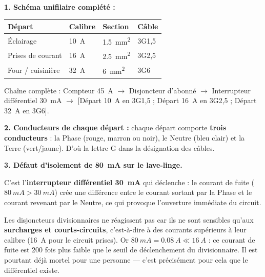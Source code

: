 \documentclass[11pt]{article}
\begin{document}
\begin{corrige}
\textbf{1. Schéma unifilaire complété :}
\begin{center}
\begin{tabularx}{\linewidth}{|X|l|l|l|}
\hline
\rowcolor{popblueL} \textbf{Départ} & \textbf{Calibre} & \textbf{Section} & \textbf{Câble} \\
\hline
Éclairage & \SI{10}{A} & \SI{1,5}{mm^2} & 3G1,5 \\
\hline
Prises de courant & \SI{16}{A} & \SI{2,5}{mm^2} & 3G2,5 \\
\hline
Four / cuisinière & \SI{32}{A} & \SI{6}{mm^2} & 3G6 \\
\hline
\end{tabularx}
\end{center}
Chaîne complète : Compteur \SI{45}{A} $\rightarrow$ Disjoncteur d'abonné $\rightarrow$ Interrupteur différentiel \SI{30}{mA} $\rightarrow$ [Départ \SI{10}{A} en 3G1,5 ; Départ \SI{16}{A} en 3G2,5 ; Départ \SI{32}{A} en 3G6].

\textbf{2. Conducteurs de chaque départ :} chaque départ comporte \textbf{trois conducteurs} : la Phase (rouge, marron ou noir), le Neutre (bleu clair) et la Terre (vert/jaune). D'où la lettre G dans la désignation des câbles.

\textbf{3. Défaut d'isolement de \SI{80}{mA} sur le lave-linge.}

C'est l'\textbf{interrupteur différentiel \SI{30}{mA}} qui déclenche : le courant de fuite ($\SI{80}{mA} > \SI{30}{mA}$) crée une différence entre le courant sortant par la Phase et le courant revenant par le Neutre, ce qui provoque l'ouverture immédiate du circuit.

Les disjoncteurs divisionnaires ne réagissent pas car ils ne sont sensibles qu'aux \textbf{surcharges et courts-circuits}, c'est-à-dire à des courants supérieurs à leur calibre (\SI{16}{A} pour le circuit prises). Or $\SI{80}{mA} = \SI{0,08}{A} \ll \SI{16}{A}$ : ce courant de fuite est 200 fois plus faible que le seuil de déclenchement du divisionnaire. Il est pourtant déjà mortel pour une personne — c'est précisément pour cela que le différentiel existe.


\end{corrige}
\end{document}
